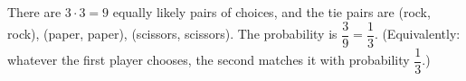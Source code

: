 There are $3\cdot3=9$ equally likely pairs of choices, and the tie pairs are (rock, rock), (paper, paper), (scissors, scissors). The probability is $\dfrac{3}{9}=\boxed{\dfrac{1}{3}}$. (Equivalently: whatever the first player chooses, the second matches it with probability $\dfrac{1}{3}$.)
